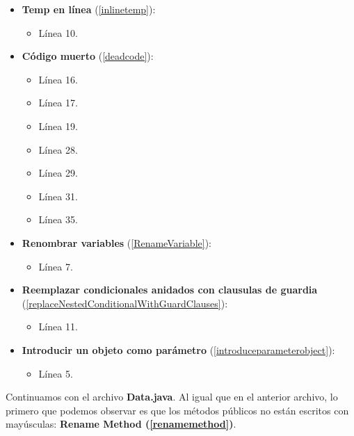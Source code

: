 \documentclass[11pt,a4paper,oneside]{book}
\begin{document}
\begin{itemize}
    \item \textbf{Temp en línea} (\ref{inlinetemp}):
    \begin{itemize}
        \item Línea 10.
    \end{itemize}
    
    \item \textbf{Código muerto} (\ref{deadcode}):
    \begin{itemize}
        \item Línea 16.
        \item Línea 17.
        \item Línea 19.
        \item Línea 28.
        \item Línea 29.
        \item Línea 31.
        \item Línea 35.
    \end{itemize}
    
    \item \textbf{Renombrar variables} (\ref{RenameVariable}):
    \begin{itemize}
        \item Línea 7.
    \end{itemize}
    
    \item \textbf{Reemplazar condicionales anidados con clausulas de guardia} (\ref{replaceNestedConditionalWithGuardClauses}):
    \begin{itemize}
        \item Línea 11.
    \end{itemize}
    
    \item \textbf{Introducir un objeto como parámetro} (\ref{introduceparameterobject}):
    \begin{itemize}
        \item Línea 5.
    \end{itemize}
\end{itemize}

Continuamos con el archivo \textbf{Data.java}. Al igual que en el anterior archivo, lo primero que podemos observar es que los métodos públicos no están escritos con mayúsculas: \textbf{Rename Method (\ref{renamemethod})}.


\end{document}
